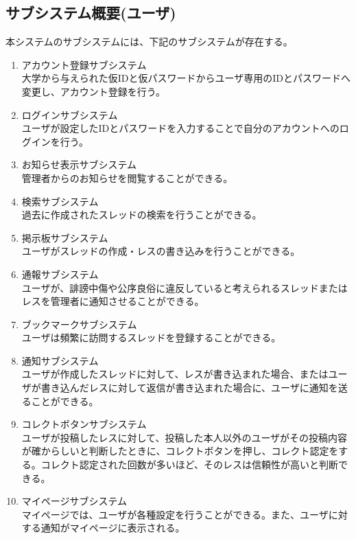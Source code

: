 \documentclass[a4j]{jarticle}
\begin{document}
\subsection{サブシステム概要(ユーザ)}
本システムのサブシステムには、下記のサブシステムが存在する。
\begin{enumerate}
\item アカウント登録サブシステム\\
大学から与えられた仮IDと仮パスワードからユーザ専用のIDとパスワードへ変更し、アカウント登録を行う。

\item ログインサブシステム\\
ユーザが設定したIDとパスワードを入力することで自分のアカウントへのログインを行う。

\item お知らせ表示サブシステム\\
管理者からのお知らせを閲覧することができる。

\item 検索サブシステム\\
過去に作成されたスレッドの検索を行うことができる。


\item 掲示板サブシステム\\
ユーザがスレッドの作成・レスの書き込みを行うことができる。


\item 通報サブシステム\\
ユーザが、誹謗中傷や公序良俗に違反していると考えられるスレッドまたはレスを管理者に通知させることができる。


\item ブックマークサブシステム\\
ユーザは頻繁に訪問するスレッドを登録することができる。


\item 通知サブシステム\\
ユーザが作成したスレッドに対して、レスが書き込まれた場合、またはユーザが書き込んだレスに対して返信が書き込まれた場合に、ユーザに通知を送ることができる。


\item コレクトボタンサブシステム\\
ユーザが投稿したレスに対して、投稿した本人以外のユーザがその投稿内容が確からしいと判断したときに、コレクトボタンを押し、コレクト認定をする。コレクト認定された回数が多いほど、そのレスは信頼性が高いと判断できる。


\item マイページサブシステム\\
マイページでは、ユーザが各種設定を行うことができる。また、ユーザに対する通知がマイページに表示される。
\end{enumerate}
\end{document}
